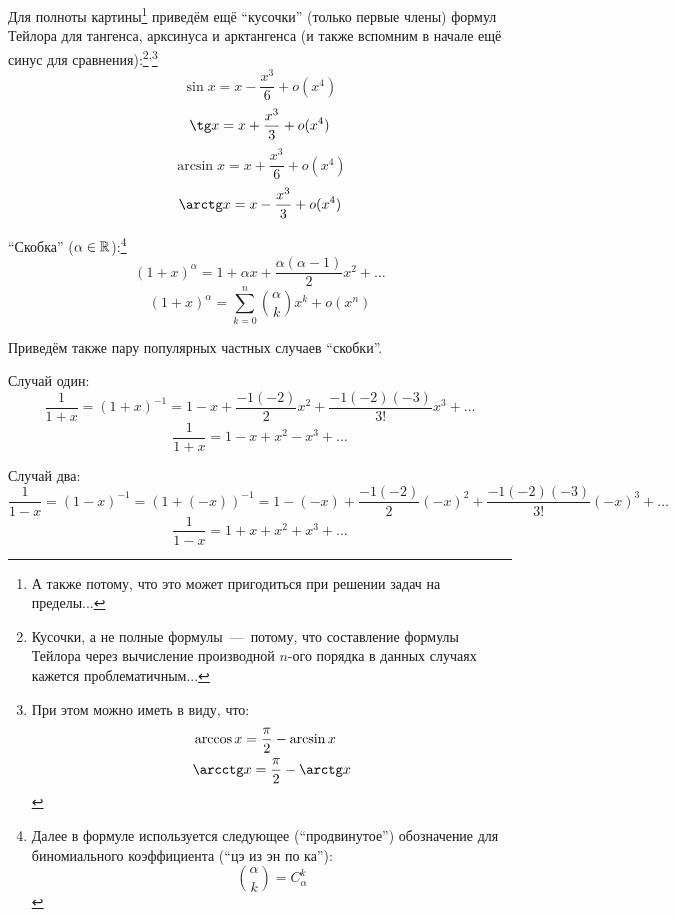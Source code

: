 \documentclass[a4paper,12pt]{article}
\begin{document}
  Для полноты картины\footnote{
    А также потому, что это может пригодиться при решении задач на пределы...
  } приведём ещё ``кусочки'' (только первые члены) формул Тейлора для тангенса, арксинуса и арктангенса (и также вспомним в начале ещё синус для сравнения):\footnote{
    Кусочки, а не полные формулы~---~потому, что составление формулы Тейлора через вычисление производной $n$-ого порядка в данных случаях кажется проблематичным...
  }\textsuperscript{,}\footnote{  %
    При этом можно иметь в виду, что:
    \[
      \begin{aligned}
        &\arccos x = \frac{\pi}{2} - \arcsin x\\
        &\arcctg x = \frac{\pi}{2} - \arctg x
      \end{aligned}
    \]
  }
  \[
    \sin x = x - \frac{x^3}{6} + o(x^4)
  \]
  \begin{equation}\label{eq:easy-tg}
    \tg x = x + \frac{x^3}{3} + o(x^4)
  \end{equation}
  \begin{equation}\label{eq:easy-arcsin}
    \arcsin x = x + \frac{x^3}{6} + o(x^4)
  \end{equation}
  \begin{equation}\label{eq:easy-arctg}
    \arctg x = x - \frac{x^3}{3} + o(x^4)
  \end{equation}

  ``Скобка'' ($\alpha \in \operatorname{\mathbb R}$):\footnote{
    Далее в формуле используется следующее (``продвинутое'') обозначение для биномиального коэффициента (``цэ из эн по ка''):
    \[
      \binom{\alpha}{k} = C_{\alpha}^k
    \]
  }
  \[
    (1 + x)^{\alpha} = 1 + \alpha x + \frac{\alpha (\alpha - 1)}{2} x^2 + \ldots
  \]
  \begin{equation}\label{eq:brace}
    (1 + x)^{\alpha} = \sum_{k = 0}^n \binom{\alpha}{k} x^k + o(x^n)
  \end{equation}

  \begin{example}
    Приведём также пару популярных частных случаев ``скобки''.

    Случай один:
    \[
      \frac{1}{1 + x} = (1 + x)^{-1} = 1 - x + \frac{-1(-2)}{2} x^2 + \frac{-1(-2)(-3)}{3!} x^3 + \ldots
    \]
    \begin{equation}\label{eq:1-div-plus}
      \frac{1}{1 + x} = 1 - x + x^2 - x^3 + \ldots
    \end{equation}

    Случай два:
    \[
      \frac{1}{1 - x} = (1 - x)^{-1} = (1 + (-x))^{-1} = 1 - (-x) + \frac{-1(-2)}{2} (-x)^2 + \frac{-1(-2)(-3)}{3!} (-x)^3 + \ldots
    \]
    \begin{equation}\label{eq:1-div-minus}
      \frac{1}{1 - x} = 1 + x + x^2 + x^3 + \ldots
    \end{equation}
  \end{example}
\end{document}
